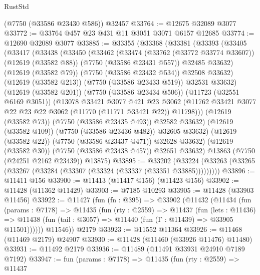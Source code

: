 \begin{lexlean}{RustStd}
\begin{coremodule}
    (@7750 (@33586 @23430 @586))
    @32457
@33764 := @12675 @32089 @3077
@33772 := @33764 @457 @23 @431 @11 @3051 @3071 @6157 @12685
@33774 := @12690 @32089 @3077
@33885 := @33355
    (@33368
      (@33381
        (@33393
          (@33405
            (@33417
              (@33438
                (@33450
                  (@33462
                    (@33474
                      (@33762 (@33772 @33774 @33607))
                      (@12619 (@33582 @88))
                      (@7750 (@33586 @23431 @557))
                      @32485
                      @33632)
                    (@12619 (@33582 @79))
                    (@7750 (@33586 @23432 @534))
                    @32508
                    @33632)
                  (@12619 (@33582 @213))
                  (@7750 (@33586 @23433 @519))
                  @32531
                  @33632)
                (@12619 (@33582 @201))
                (@7750 (@33586 @23434 @506))
                (@11723 (@32551 @6169 @3051))
                (@13078
                  @33421
                  @3077
                  @421
                  @23
                  @3062
                  (@11762 @33421 @3077 @22 @23 @22 @3062 (@11770 (@11771 @33421 @22)) @11798)))
              (@12619 (@33582 @73))
              (@7750 (@33586 @23435 @493))
              @32582
              @33632)
            (@12619 (@33582 @109))
            (@7750 (@33586 @23436 @482))
            @32605
            @33632)
          (@12619 (@33582 @22))
          (@7750 (@33586 @23437 @471))
          @32628
          @33632)
        (@12619 (@33582 @30))
        (@7750 (@33586 @23438 @457))
        @32651
        @33632)
      @13863
      (@7750 (@24251 @2162 @23439))
      @13875)
@33895 := @33202
    (@33224 (@33263 (@33265 (@33267 (@33284 (@33307 (@33324 (@33337 (@33351 @33885)))))))))
@33896 := @11411 @156
@33900 := @11413 (@11417 @156) (@11423 @156)
@33902 := @11428 (@11362 @11429)
@33903 := @7185 @10293
@33905 := @11428 (@33903 @11456)
@33922 := @11427
    (fun (fn : @395) =>
    @33902
      (@11432
        (@11434
          (fun (params : @7178) =>
          @11435
            (fun (rty : @2559) =>
            @11437
              (fun (lets : @11436) =>
              @11438 (fun (tail : @3057) => @11440 (fun (Γ : @11439) => @33905 @11501))))))
        @11546))
    @2179
@33923 := @11552 @11364
@33926 := @11468 (@11469 @2179) @24907
@33930 := @11428 (@11460 (@33926 @11476) @11480)
@33931 := @11492 @2179
@33936 := @11489 (@11491 @33931 @24910 @7189 @7192)
@33947 := fun (params : @7178) =>
  @11435
    (fun (rty : @2559) =>
    @11437

\end{coremodule}
\end{lexlean}
